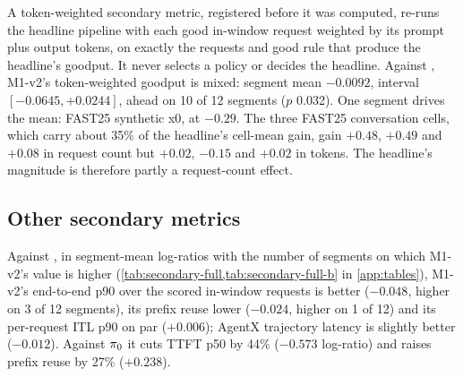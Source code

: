 A token-weighted secondary metric, registered before it was computed, re-runs the headline pipeline
with each good in-window request weighted by its prompt plus output tokens, on exactly the requests
and good rule that produce the headline's goodput. It never selects a policy or decides the headline.
Against , M1-v2's token-weighted goodput is mixed: segment mean $-0.0092$, interval
$[-0.0645, +0.0244]$, ahead on 10 of 12 segments ($p$ 0.032). One segment drives the mean: FAST25
synthetic x0, at $-0.29$. The three FAST25 conversation cells, which carry about 35\% of the
headline's cell-mean gain, gain $+0.48$, $+0.49$ and $+0.08$ in request count but $+0.02$, $-0.15$
and $+0.02$ in tokens. The headline's magnitude is therefore partly a request-count effect.

\subsection{Other secondary metrics}

Against , in segment-mean log-ratios with the number of segments on which M1-v2's
value is higher (\cref{tab:secondary-full,tab:secondary-full-b} in \cref{app:tables}), M1-v2's
end-to-end p90 over the
scored in-window requests is better ($-0.048$, higher on 3 of 12 segments), its prefix reuse lower
($-0.024$, higher on 1 of 12) and its per-request ITL p90 on par ($+0.006$); AgentX trajectory
latency is slightly better ($-0.012$). Against $\pi_{0}$ it cuts TTFT p50 by 44\% ($-0.573$
log-ratio) and raises prefix reuse by 27\% ($+0.238$).
